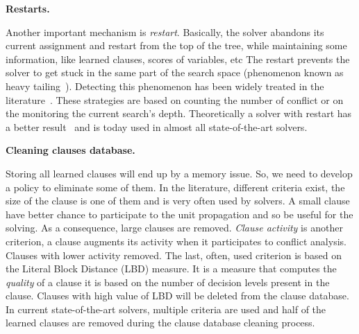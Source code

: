 \textbf{Restarts.}

Another important mechanism is \emph{restart}. Basically, the solver abandons its current assignment and 
restart from the top of the tree, while maintaining some information, like learned clauses, scores of variables, etc The restart prevents the solver to get stuck in the same part of the search space (phenomenon known as heavy tailing~\cite{gomes1997heavy}).
Detecting this phenomenon has been widely treated in the literature~\cite{audemard2012refining,biere2008adaptive}.
These strategies are based on counting the number of conflict or on the monitoring the current search's depth.
Theoretically a solver with restart has a better result~\cite{huang2007effect} and is today
used in almost all state-of-the-art solvers.

\textbf{Cleaning clauses database.}

Storing  all learned clauses will end up by a memory issue. So, we need to develop a policy to eliminate
some of them. In the literature, different criteria exist,
 the size of the clause is one of them and is very often used by solvers. 
 A small clause have better chance to participate to the unit propagation and so be useful for the solving.
 As a consequence, large clauses are removed.
\emph{Clause activity} is another criterion, a clause augments its activity when it participates to conflict analysis. 
Clauses with lower activity removed.
 The last, often, used criterion is based on the Literal Block Distance (LBD) measure. It is a measure that computes the \emph{quality} of a clause it is based on the number of decision levels present in the clause. Clauses with high value of LBD will be deleted from the clause database.
In current state-of-the-art solvers, multiple criteria are used and half of the learned clauses are removed during the clause database cleaning process.
